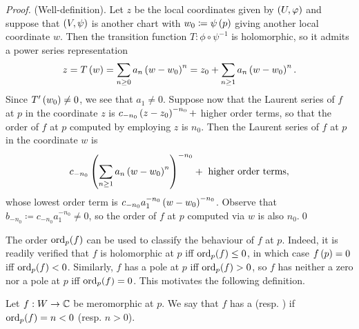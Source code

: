 \documentclass[../Moduli_Spaces_of_Riemann_Surfaces.tex]{subfiles}
\begin{document}
    \begin{proof}
        (Well-definition). Let $z$ be the local coordinates given by $\left(U,\varphi\right)$ and suppose that $\left(V,\psi\right)$ is another chart with $w_0\coloneqq\psi\left(p\right)$ giving another local coordinate $w$. Then the transition function $T:\phi\circ\psi^{-1}$ is holomorphic, so it admits a power series representation
        \begin{equation*}
            z=T\left(w\right)=\sum_{n\geq0}a_n\left(w-w_0\right)^n=z_0+\sum_{n\geq1}a_n\left(w-w_0\right)^n.
        \end{equation*}
        Since $T'\left(w_0\right)\neq0$, we see that $a_1\neq0$. Suppose now that the Laurent series of $f$ at $p$ in the coordinate $z$ is $c_{-n_0}\left(z-z_0\right)^{-n_0}+$ higher order terms, so that the order of $f$ at $p$ computed by employing $z$ is $n_0$. Then the Laurent series of $f$ at $p$ in the coordinate $w$ is
        \begin{equation*}
            c_{-n_0}\left(\sum_{n\geq1}a_n\left(w-w_0\right)^n\right)^{-n_0}+\textrm{ higher order terms},
        \end{equation*}
        whose lowest order term is $c_{-n_0}a_1^{-n_0}\left(w-w_0\right)^{-n_0}$. Observe that $b_{-n_0}\coloneqq c_{-n_0}a_1^{-n_0}\neq0$, so the order of $f$ at $p$ computed via $w$ is also $n_0$.\qed
    \end{proof}
    \begin{remark}
        The order $\operatorname{ord}_p\!\left(f\right)$ can be used to classify the behaviour of $f$ at $p$. Indeed, it is readily verified that $f$ is holomorphic at $p$ iff $\operatorname{ord}_p\!\left(f\right)\leq0$, in which case $f\left(p\right)=0$ iff $\operatorname{ord}_p\!\left(f\right)<0$. Similarly, $f$ has a pole at $p$ iff $\operatorname{ord}_p\!\left(f\right)>0$, so $f$ has neither a zero nor a pole at $p$ iff $\operatorname{ord}_p\!\left(f\right)=0$. This motivates the following definition.\exqed
    \end{remark}
    \begin{definition}
        Let $f:W\to\mathbb{C}$ be meromorphic at $p$. We say that $f$ has a  (resp. )  if $\operatorname{ord}_p\!\left(f\right)=n<0$ (resp. $n>0$).
    \end{definition}
\end{document}
